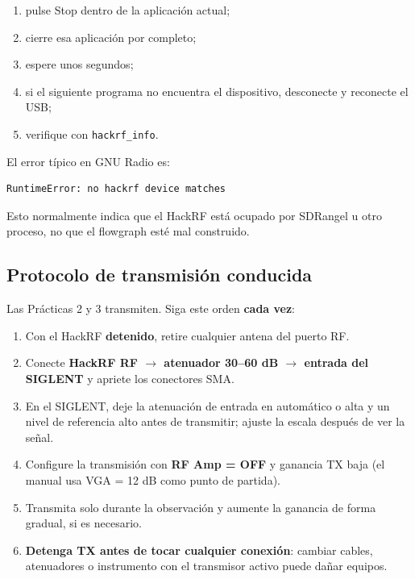 \begin{enumerate}
    \item pulse Stop dentro de la aplicación actual;
    \item cierre esa aplicación por completo;
    \item espere unos segundos;
    \item si el siguiente programa no encuentra el dispositivo, desconecte y reconecte el USB;
    \item verifique con \texttt{hackrf\_info}.
\end{enumerate}

El error típico en GNU Radio es:

\begin{lstlisting}
RuntimeError: no hackrf device matches
\end{lstlisting}

Esto normalmente indica que el HackRF está ocupado por SDRangel u otro proceso, no que el flowgraph esté mal construido.

\subsection{Protocolo de transmisión conducida}
\label{sec:protocolo-tx}

Las Prácticas 2 y 3 transmiten. Siga este orden \textbf{cada vez}:

\begin{enumerate}
    \item Con el HackRF \textbf{detenido}, retire cualquier antena del puerto RF.
    \item Conecte \textbf{HackRF RF $\rightarrow$ atenuador 30--60 dB $\rightarrow$ entrada del SIGLENT} y apriete los conectores SMA.
    \item En el SIGLENT, deje la atenuación de entrada en automático o alta y un nivel de referencia alto antes de transmitir; ajuste la escala después de ver la señal.
    \item Configure la transmisión con \textbf{RF Amp = OFF} y ganancia TX baja (el manual usa VGA = 12 dB como punto de partida).
    \item Transmita solo durante la observación y aumente la ganancia de forma gradual, si es necesario.
    \item \textbf{Detenga TX antes de tocar cualquier conexión}: cambiar cables, atenuadores o instrumento con el transmisor activo puede dañar equipos.
\end{enumerate}


